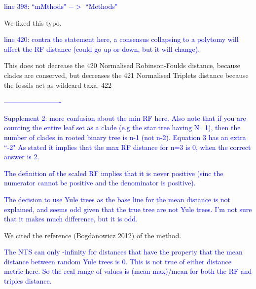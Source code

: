 \documentclass[11pt]{letter}
\begin{document}
\begin{letter}{}

\textcolor{blue}{line 398: ``mMthods" $->$ ``Methods"}

We fixed this typo.

\textcolor{blue}{line 420: contra the statement here, a consensus collapsing to a polytomy will affect the RF distance (could go up or down, but it will change).}


This does not decrease the 420
Normalised Robinson-Foulds distance, because clades are conserved, but decreases the 421
Normalised Triplets distance because the fossils act as wildcard taxa. 422




\textcolor{blue}{-------------------------}


\textcolor{blue}{Supplement 2:}
\textcolor{blue}{more confusion about the min RF here. Also note that if you are counting the entire leaf set as a clade (e.g the star tree having N=1), then the number of clades in rooted binary tree is n-1 (not n-2). Equation 3 has an extra ``-2" As stated it implies that the max RF distance for n=3 is 0, when the correct answer is 2.}



\textcolor{blue}{The definition of the scaled RF implies that it is never positive (sinc the numerator cannot be positive and the denominator is positive).}



\textcolor{blue}{The decision to use Yule trees as the base line for the mean distance is not explained, and seems odd given that the true tree are not Yule trees. I'm not sure that it makes much difference, but it is odd.}

We cited the reference (Bogdanowicz 2012) of the method.


\textcolor{blue}{The NTS can only -infinity for distances that have the property that the mean distance between random Yule trees is 0. This is not true of either distance metric here. So the real range of values is (mean-max)/mean for both the RF and triples distance.}


\end{letter}
\end{document}
